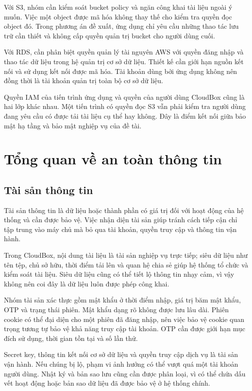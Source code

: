 Với S3, nhóm cần kiểm soát bucket policy và ngăn công khai tài liệu ngoài ý muốn. Việc một object được mã hóa không thay thế cho kiểm tra quyền đọc object đó. Trong phương án đề xuất, ứng dụng chỉ yêu cầu những thao tác lưu trữ cần thiết và không cấp quyền quản trị bucket cho người dùng cuối.\cite{s3security}

Với RDS, cần phân biệt quyền quản lý tài nguyên AWS với quyền đăng nhập và thao tác dữ liệu trong hệ quản trị cơ sở dữ liệu. Thiết kế cần giới hạn nguồn kết nối và sử dụng kết nối được mã hóa. Tài khoản dùng bởi ứng dụng không nên đồng thời là tài khoản quản trị toàn bộ cơ sở dữ liệu.\cite{rdssecurity}

Quyền IAM của tiến trình ứng dụng và quyền của người dùng CloudBox cũng là hai lớp khác nhau. Một tiến trình có quyền đọc S3 vẫn phải kiểm tra người dùng đang yêu cầu có được tải tài liệu cụ thể hay không. Đây là điểm kết nối giữa bảo mật hạ tầng và bảo mật nghiệp vụ của đề tài.

\section{Tổng quan về an toàn thông tin}
\subsection{Tài sản thông tin}
Tài sản thông tin là dữ liệu hoặc thành phần có giá trị đối với hoạt động của hệ thống và cần được bảo vệ. Việc nhận diện tài sản giúp tránh cách tiếp cận chỉ tập trung vào máy chủ mà bỏ qua tài khoản, quyền truy cập và thông tin vận hành.

Trong CloudBox, nội dung tài liệu là tài sản nghiệp vụ trực tiếp; siêu dữ liệu như tên tệp, chủ sở hữu, thời điểm tải lên và quan hệ chia sẻ giúp hệ thống tổ chức và kiểm soát tài liệu. Siêu dữ liệu cũng có thể tiết lộ thông tin nhạy cảm, vì vậy không nên coi đây là dữ liệu luôn được phép công khai.

Nhóm tài sản xác thực gồm mật khẩu ở thời điểm nhập, giá trị băm mật khẩu, OTP và trạng thái phiên. Mật khẩu dạng rõ không được lưu lâu dài. Phiên cookie có thể đại diện cho một phiên đã đăng nhập, nên việc bảo vệ cookie quan trọng tương tự bảo vệ khả năng truy cập tài khoản. OTP cần được giới hạn mục đích sử dụng, thời gian tồn tại và số lần thử.

Secret key, thông tin kết nối cơ sở dữ liệu và quyền truy cập dịch vụ là tài sản vận hành. Nếu chúng bị lộ, phạm vi ảnh hưởng có thể vượt quá một tài khoản người dùng. Nhật ký và bản sao lưu cũng cần được phân loại, vì có thể chứa dấu vết hoạt động hoặc bản sao dữ liệu đã được bảo vệ ở hệ thống chính.

